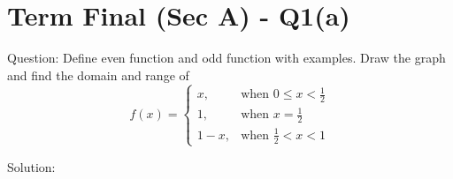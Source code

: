 \documentclass[11pt, a4paper]{article}
\begin{document}

\section*{Term Final (Sec A) - Q1(a)}

Question:
Define even function and odd function with examples. Draw the graph and find the domain and range of 
\[ 
f(x) = \begin{cases} 
x, & \text{when } 0 \le x < \frac{1}{2} \\ 
1, & \text{when } x = \frac{1}{2} \\ 
1-x, & \text{when } \frac{1}{2} < x < 1 
\end{cases} 
\]

Solution:
\end{document}
